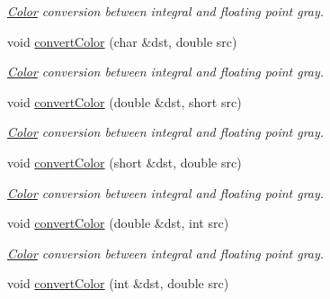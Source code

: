 \begin{DoxyCompactItemize}
\begin{DoxyCompactList}\small\item\em \hyperlink{class_d_o_1_1_color}{Color} conversion between integral and floating point gray. \end{DoxyCompactList}\item 
\hypertarget{group___color_conversion_gafa121f60ad1fdb13a51e65294ec19b33}{void \hyperlink{group___color_conversion_gafa121f60ad1fdb13a51e65294ec19b33}{convert\-Color} (char \&dst, double src)}\label{group___color_conversion_gafa121f60ad1fdb13a51e65294ec19b33}

\begin{DoxyCompactList}\small\item\em \hyperlink{class_d_o_1_1_color}{Color} conversion between integral and floating point gray. \end{DoxyCompactList}\item 
\hypertarget{group___color_conversion_ga50a8d828c5c4d4fa0acaf3f9660bdf76}{void \hyperlink{group___color_conversion_ga50a8d828c5c4d4fa0acaf3f9660bdf76}{convert\-Color} (double \&dst, short src)}\label{group___color_conversion_ga50a8d828c5c4d4fa0acaf3f9660bdf76}

\begin{DoxyCompactList}\small\item\em \hyperlink{class_d_o_1_1_color}{Color} conversion between integral and floating point gray. \end{DoxyCompactList}\item 
\hypertarget{group___color_conversion_gadf9e5fe5ca24d599c7aad7752e4f89c5}{void \hyperlink{group___color_conversion_gadf9e5fe5ca24d599c7aad7752e4f89c5}{convert\-Color} (short \&dst, double src)}\label{group___color_conversion_gadf9e5fe5ca24d599c7aad7752e4f89c5}

\begin{DoxyCompactList}\small\item\em \hyperlink{class_d_o_1_1_color}{Color} conversion between integral and floating point gray. \end{DoxyCompactList}\item 
\hypertarget{group___color_conversion_gacf7ae24078f1be907709c70a71be6127}{void \hyperlink{group___color_conversion_gacf7ae24078f1be907709c70a71be6127}{convert\-Color} (double \&dst, int src)}\label{group___color_conversion_gacf7ae24078f1be907709c70a71be6127}

\begin{DoxyCompactList}\small\item\em \hyperlink{class_d_o_1_1_color}{Color} conversion between integral and floating point gray. \end{DoxyCompactList}\item 
\hypertarget{group___color_conversion_ga86287b233492b328656c5c22f85d0baa}{void \hyperlink{group___color_conversion_ga86287b233492b328656c5c22f85d0baa}{convert\-Color} (int \&dst, double src)}\label{group___color_conversion_ga86287b233492b328656c5c22f85d0baa}


\end{DoxyCompactItemize}

